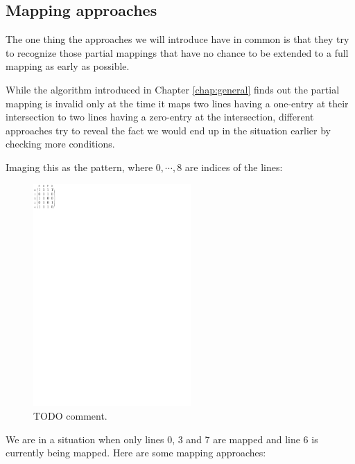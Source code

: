 \subsection{Mapping approaches}
\label{sect:approaches}
The one thing the approaches we will introduce have in common is that they try to recognize those partial mappings that have no chance to be extended to a full mapping as early as possible.

While the algorithm introduced in Chapter \ref{chap:general} finds out the partial mapping is invalid only at the time it maps two lines having a one-entry at their intersection to two lines having a zero-entry at the intersection, different approaches try to reveal the fact we would end up in the situation earlier by checking more conditions.

Imaging this as the pattern, where $0,\cdots,8$ are indices of the lines:
\begin{figure}[h!]
\centering
\includegraphics[width=60mm]{../img/approaches.pdf}
\caption{TODO comment.}
\label{approaches}
\end{figure}

We are in a situation when only lines 0, 3 and 7 are mapped and line 6 is currently being mapped. Here are some mapping approaches:
